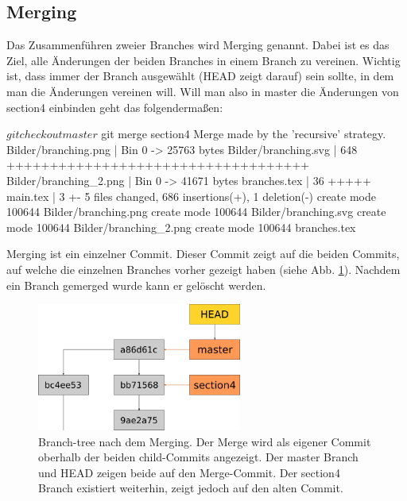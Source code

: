 \subsection{Merging}
Das Zusammenführen zweier Branches wird Merging genannt. Dabei ist es das Ziel, alle Änderungen der beiden Branches in einem Branch zu vereinen. Wichtig ist, dass immer der Branch ausgewählt (HEAD zeigt darauf) sein sollte, in dem man die Änderungen vereinen will. Will man also in master die Änderungen von section4 einbinden geht das folgendermaßen:
\begin{mplisting}
	$ git checkout master
	$ git merge section4
	Merge made by the 'recursive' strategy.
	Bilder/branching.png   | Bin 0 -> 25763 bytes
	Bilder/branching.svg   | 648 +++++++++++++++++++++++++++++++++++
	Bilder/branching_2.png | Bin 0 -> 41671 bytes
	branches.tex           |  36 +++++
	main.tex               |   3 +-
	5 files changed, 686 insertions(+), 1 deletion(-)
	create mode 100644 Bilder/branching.png
	create mode 100644 Bilder/branching.svg
	create mode 100644 Bilder/branching_2.png
	create mode 100644 branches.tex
\end{mplisting}
Merging ist ein einzelner Commit. Dieser Commit zeigt auf die beiden Commits, auf welche die einzelnen Branches vorher gezeigt haben (siehe Abb. \ref{fig:merge}). Nachdem ein Branch gemerged wurde kann er gelöscht werden.
\begin{figure}[!ht]
	\centering
	\includegraphics[width=0.6\textwidth]{Bilder/branching_3.png}
	\caption{Branch-tree nach dem Merging. Der Merge wird als eigener Commit oberhalb der beiden child-Commits angezeigt. Der master Branch und HEAD zeigen beide auf den Merge-Commit. Der section4 Branch existiert weiterhin, zeigt jedoch auf den alten Commit.}
	\label{fig:merge}
\end{figure}

